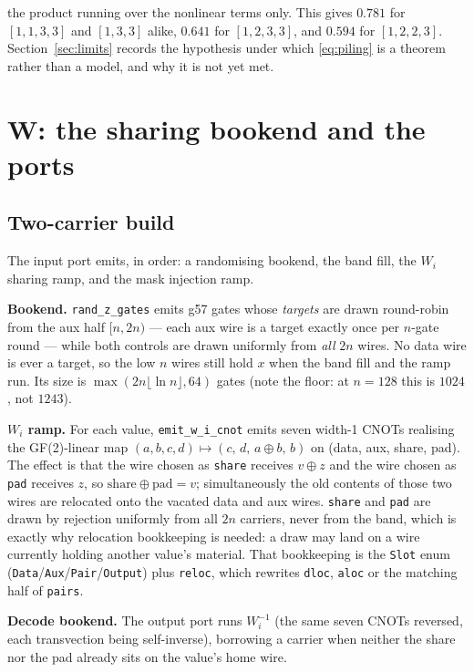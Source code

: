 \documentclass[11pt]{article}
\newcommand{\xor}{\oplus}
\newcommand{\code}[1]{\texttt{#1}}
\begin{document}
the product running over the nonlinear terms only. This gives $0.781$ for
$[1,1,3,3]$ and $[1,3,3]$ alike, $0.641$ for $[1,2,3,3]$, and $0.594$ for
$[1,2,2,3]$. Section~\ref{sec:limits} records the hypothesis under which
\eqref{eq:piling} is a theorem rather than a model, and why it is not yet met.

\section{W: the sharing bookend and the ports}

\subsection{Two-carrier build}

The input port emits, in order: a randomising bookend, the band fill, the $W_i$
sharing ramp, and the mask injection ramp.

\textbf{Bookend.} \code{rand\_z\_gates} emits g57 gates whose \emph{targets} are
drawn round-robin from the aux half $[n,2n)$ --- each aux wire is a target
exactly once per $n$-gate round --- while both controls are drawn uniformly
from \emph{all} $2n$ wires. No data wire is ever a target, so the low $n$ wires
still hold $x$ when the band fill and the ramp run. Its size is
$\max(2n\lfloor \ln n\rfloor, 64)$ gates (note the floor: at $n{=}128$ this is
$1024$, not $1243$).

\textbf{$W_i$ ramp.} For each value, \code{emit\_w\_i\_cnot} emits seven width-1
CNOTs realising the GF(2)-linear map $(a,b,c,d)\mapsto(c,\,d,\,a\xor b,\,b)$ on
(data, aux, share, pad). The effect is that the wire chosen as \code{share}
receives $v \xor z$ and the wire chosen as \code{pad} receives $z$, so
$\text{share}\xor\text{pad}=v$; simultaneously the old contents of those two
wires are relocated onto the vacated data and aux wires. \code{share} and
\code{pad} are drawn by rejection uniformly from all $2n$ carriers, never from
the band, which is exactly why relocation bookkeeping is needed: a draw may
land on a wire currently holding another value's material. That bookkeeping is
the \code{Slot} enum (\code{Data}/\code{Aux}/\code{Pair}/\code{Output}) plus
\code{reloc}, which rewrites \code{dloc}, \code{aloc} or the matching half of
\code{pairs}.

\textbf{Decode bookend.} The output port runs $W_i^{-1}$ (the same seven CNOTs
reversed, each transvection being self-inverse), borrowing a carrier when
neither the share nor the pad already sits on the value's home wire.
\end{document}
